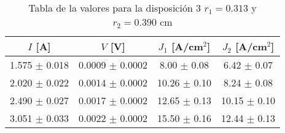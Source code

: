 \begin{table}[H]
    \centering
\begin{tabular}{cccc}
\toprule
$I$ [A] & $V$ [V] & $J_1$ [A/cm$^2$] & $J_2$ [A/cm$^2$] \\
\midrule
1.575 $\pm$ 0.018 & 0.0009 $\pm$ 0.0002 & 8.00 $\pm$ 0.08 & 6.42 $\pm$ 0.07 \\
2.020 $\pm$ 0.022 & 0.0014 $\pm$ 0.0002 & 10.26 $\pm$ 0.10 & 8.24 $\pm$ 0.08 \\
2.490 $\pm$ 0.027 & 0.0017 $\pm$ 0.0002 & 12.65 $\pm$ 0.13 & 10.15 $\pm$ 0.10 \\
3.051 $\pm$ 0.033 & 0.0022 $\pm$ 0.0002 & 15.50 $\pm$ 0.16 & 12.44 $\pm$ 0.13 \\
\bottomrule
\end{tabular}
    \caption{Tabla de la valores para la disposición 3 $r_1=0.313$ y $r_2= 0.390 $ cm }
    \label{Tab:VIJ_3}
\end{table}
